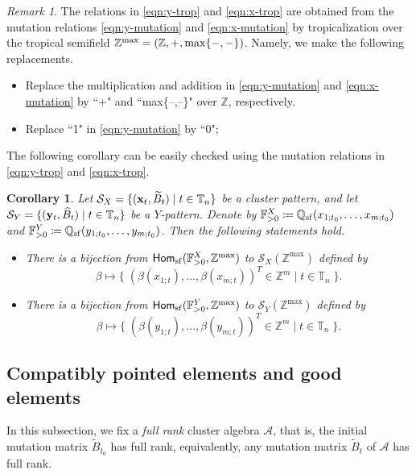 \documentclass[12pt]{amsart}
\newtheorem{corollary}[theorem]{Corollary}
\theoremstyle{definition}
\theoremstyle{remark}
\newtheorem{remark}[theorem]{Remark}
\numberwithin{equation}{section}
\newcommand{\opname}[1]{\operatorname{\mathsf{#1}}}
\newcommand{\Hom}{\opname{Hom}}
\begin{document}
\begin{remark}
The relations in \eqref{eqn:y-trop} and  \eqref{eqn:x-trop}  are obtained from the mutation relations \eqref{eqn:y-mutation} and \eqref{eqn:x-mutation} by tropicalization over the tropical semifield $\mathbb Z^{\rm max}=(\mathbb Z,+,\max\{-,-\})$. Namely, we make the following replacements.
\begin{itemize}
    \item Replace the multiplication and addition in \eqref{eqn:y-mutation} and \eqref{eqn:x-mutation}  by ``+" and ``{\rm max}\{--,--\}" over $\mathbb Z$, respectively.
     \item Replace ``1" in \eqref{eqn:y-mutation} by ``0";
\end{itemize}
\end{remark}

The following corollary can be easily checked using the mutation relations in \eqref{eqn:y-trop} and  \eqref{eqn:x-trop}.
\begin{corollary}\label{cor:bijection} 
Let  $\mathcal S_X=\{({\bf x}_t, \widetilde B_t)\mid t\in \mathbb T_n\}$  be a cluster pattern, and let $\mathcal S_Y=\{({\bf y}_t, \widehat B_t)\mid t\in \mathbb T_n\}$ be a $Y$-pattern. Denote by $\mathbb F_{>0}^X\coloneqq \mathbb Q_{\rm sf}(x_{1;t_0},\ldots, x_{m;t_0})$
and $\mathbb F_{>0}^Y\coloneqq \mathbb Q_{\rm sf}(y_{1;t_0},\ldots, y_{m;t_0})$. Then the following statements hold.
\begin{itemize}
\item[(i)] There is a bijection from 
$\Hom_{\rm sf}(\mathbb F_{>0}^X,\mathbb Z^{\max})$ to  $\mathcal S_X(\mathbb Z^{\max})$  defined by
\[ 
\beta \mapsto \{\;(\beta(x_{1;t}),\ldots,\beta(x_{m;t}))^T\in\mathbb Z^m\mid t\in\mathbb T_n \;\}. 
\]

\item[(ii)] There is a bijection from 
$\Hom_{\rm sf}(\mathbb F_{>0}^Y,\mathbb Z^{\max})$ to  $\mathcal S_Y(\mathbb Z^{\max})$ defined by
\[ 
\beta \mapsto \{\;(\beta(y_{1;t}),\ldots,\beta(y_{m;t}))^T\in\mathbb Z^m\mid t\in\mathbb T_n \;\}. 
\]
\end{itemize}
\end{corollary} 


\subsection{Compatibly pointed elements and good elements}
In this subsection, we fix a {\em full rank} cluster algebra $\mathcal A$, that is, the initial mutation matrix $\widetilde B_{t_0}$ has full rank, equivalently, any mutation matrix $\widetilde B_t$ of $\mathcal A$ has full rank.
\end{document}
